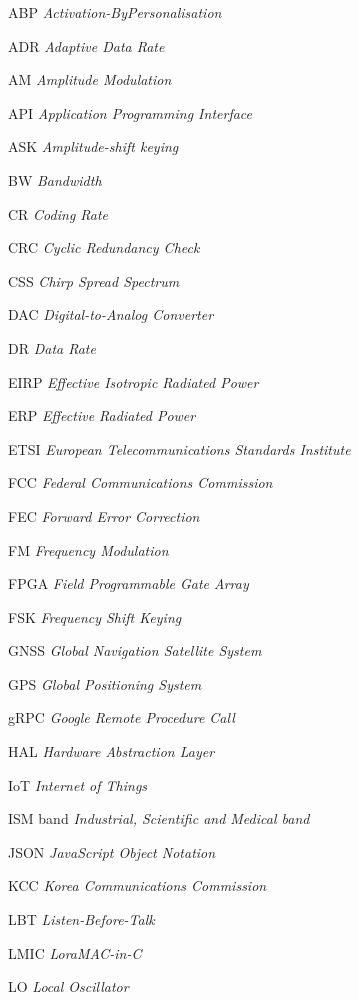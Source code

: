 \documentclass[
  12pt,				%
  openright,			%
  twoside,			%
  a4paper,			%
  english,			%
  french,				%
  spanish,			%
  brazil,				%
  ]{abntex2}
\begin{document}
\begin{siglas}
  \item[ABP]  \textit{Activation-ByPersonalisation}
  \item[ADR] \textit{Adaptive Data Rate}
  \item[AM] \textit{Amplitude Modulation}
  \item[API] \textit{Application Programming Interface}
  \item[ASK] \textit{Amplitude-shift keying}
  \item[BW] \textit{Bandwidth}
  \item[CR] \textit{Coding Rate}
  \item[CRC] \textit{Cyclic Redundancy Check}
  \item[CSS] \textit{Chirp Spread Spectrum}
  \item[DAC] \textit{Digital-to-Analog Converter}
  \item[DR] \textit{Data Rate}
  \item[EIRP] \textit{Effective Isotropic Radiated Power}
  \item[ERP] \textit{Effective Radiated Power}
  \item[ETSI] \textit{European Telecommunications Standards Institute}
  \item[FCC] \textit{Federal Communications Commission}
  \item[FEC] \textit{Forward Error Correction}
  \item[FM] \textit{Frequency Modulation}
  \item[FPGA] \textit{Field Programmable Gate Array}
  \item[FSK] \textit{Frequency Shift Keying}
  \item[GNSS] \textit{Global Navigation Satellite System}
  \item[GPS] \textit{Global Positioning System}
  \item[gRPC] \textit{Google Remote Procedure Call}
  \item[HAL] \textit{Hardware Abstraction Layer}
  \item[IoT] \textit{Internet of Things}
  \item[ISM band] \textit{Industrial, Scientific and Medical band}
  \item[JSON] \textit{JavaScript Object Notation}
  \item[KCC] \textit{Korea Communications Commission}
  \item[LBT] \textit{Listen-Before-Talk}
  \item[LMIC] \textit{LoraMAC-in-C}
  \item[LO] \textit{Local Oscillator}

\end{siglas}
\end{document}
